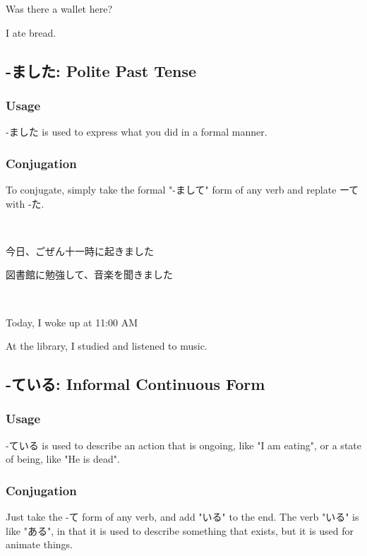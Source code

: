 \documentclass{article}
\begin{document}
\begin{CJK}{UTF8}{min}
\begin{solution}
Was there a wallet here?

I ate bread.
\end{solution}

\subsection{-ました: Polite Past Tense}

\subsubsection{Usage}

-ました is used to express what you did in a formal manner.

\subsubsection{Conjugation}

To conjugate, simply take the formal "-まして" form of any verb and replate ーて with -た.

\begin{example}
    \ 

今日、ごぜん十一時に起きました

図書館に勉強して、音楽を聞きました
\end{example}

\begin{solution}
    \ 

Today, I woke up at 11:00 AM

At the library, I studied and listened to music. 
\end{solution}

\subsection{-ている: Informal Continuous Form}

\subsubsection{Usage}

-ている is used to describe an action that is ongoing, like "I am eating", or a state of being, like "He is dead".

\subsubsection{Conjugation}

Just take the -て form of any verb, and add "いる" to the end. The verb "いる" is like "ある", in that it is used to describe something that exists, but it is used for animate things. 


\end{CJK}
\end{document}
